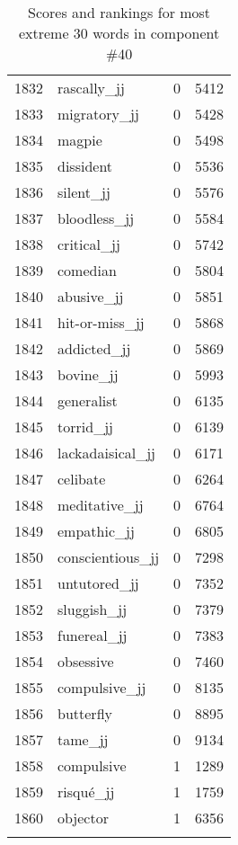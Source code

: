 \begin{longtable}[!htbp]{| rlr@{.}l |}
    1832 & rascally\_jj & 0 & 5412 \\
    1833 & migratory\_jj & 0 & 5428 \\
    1834 & magpie & 0 & 5498 \\
    1835 & dissident & 0 & 5536 \\
    1836 & silent\_jj & 0 & 5576 \\
    1837 & bloodless\_jj & 0 & 5584 \\
    1838 & critical\_jj & 0 & 5742 \\
    1839 & comedian & 0 & 5804 \\
    1840 & abusive\_jj & 0 & 5851 \\
    1841 & hit-or-miss\_jj & 0 & 5868 \\
    1842 & addicted\_jj & 0 & 5869 \\
    1843 & bovine\_jj & 0 & 5993 \\
    1844 & generalist & 0 & 6135 \\
    1845 & torrid\_jj & 0 & 6139 \\
    1846 & lackadaisical\_jj & 0 & 6171 \\
    1847 & celibate & 0 & 6264 \\
    1848 & meditative\_jj & 0 & 6764 \\
    1849 & empathic\_jj & 0 & 6805 \\
    1850 & conscientious\_jj & 0 & 7298 \\
    1851 & untutored\_jj & 0 & 7352 \\
    1852 & sluggish\_jj & 0 & 7379 \\
    1853 & funereal\_jj & 0 & 7383 \\
    1854 & obsessive & 0 & 7460 \\
    1855 & compulsive\_jj & 0 & 8135 \\
    1856 & butterfly & 0 & 8895 \\
    1857 & tame\_jj & 0 & 9134 \\
    1858 & compulsive & 1 & 1289 \\
    1859 & risqué\_jj & 1 & 1759 \\
    1860 & objector & 1 & 6356 \\
    \hline
    \caption{Scores and rankings for most extreme 30 words in component \#40} \\
\end{longtable}
